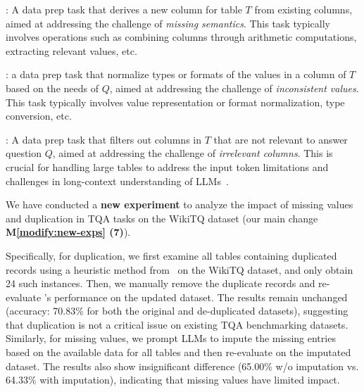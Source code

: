 \bi
	\item {}: 
    A data prep task that derives a new column for table $T$ from existing columns, aimed at addressing the challenge of \emph{missing semantics}. This task typically involves operations such as combining columns through arithmetic computations, extracting relevant values, etc.
	\item {}: a data prep task that normalize types or formats of  the values in a column of $T$ based on the needs of $Q$, {aimed at addressing the challenge of \emph{inconsistent values}}. This task typically involves value representation or format normalization, type conversion, etc.
	\item {}: A data prep task that filters out columns in $T$ that are not relevant to answer question $Q$, {aimed at addressing the challenge of \emph{irrelevant columns}}.   
    This is crucial for handling large tables to address the input token limitations and challenges in long-context understanding of LLMs~\cite{DBLP:journals/corr/abs-2404-02060}.
\ei



 We have conducted a \textbf{new experiment} to analyze the impact of missing values and duplication in TQA tasks on the WikiTQ dataset (our main change \textbf{M\ref{modify:new-exps} (7)}). 

Specifically, for duplication, we first examine all tables containing duplicated records using a heuristic method from~\cite{fan2024cost} on the WikiTQ dataset, and only obtain 24 such instances. Then, we manually remove the duplicate records and re-evaluate \sys’s performance on the updated dataset. The results remain unchanged (accuracy: 70.83\% for both the original and de-duplicated datasets), suggesting that duplication is not a critical issue on existing TQA benchmarking datasets. Similarly, for missing values, we prompt LLMs to impute the missing entries based on the available data for all tables and then re-evaluate \sys on the imputated dataset. The results also show insignificant difference (65.00\% w/o imputation vs. 64.33\% with imputation), indicating that missing values have limited impact.

